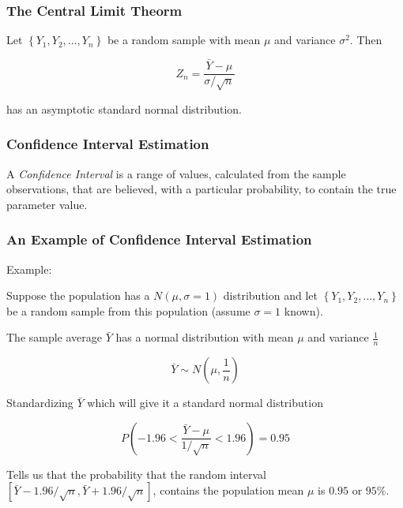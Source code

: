 \documentclass[12pt]{beamer}
\begin{document}
\begin{frame}
\frametitle{The Central Limit Theorm}
\vspace{2mm}
Let $\left\{Y_{1}, Y_{2}, \ldots, Y_{n} \right\}$ be a random sample with mean $\mu$ and variance 
$\sigma^{2}$. Then

\begin{equation*}
Z_{n} = \frac{\bar{Y} - \mu}{\sigma/\sqrt{n}}
\end{equation*}

\vspace{2mm}
has an asymptotic standard normal distribution.
\end{frame}



\begin{frame}
\frametitle{Confidence Interval Estimation}
A \emph{Confidence Interval} is a range of values, calculated from the sample observations,
that are believed, with a particular probability, to contain the true parameter value.
\end{frame}

\begin{frame}[shrink=20]
\frametitle{An Example of Confidence Interval Estimation}
Example:

\vspace{2mm}
Suppose the population has a $N(\mu, \sigma = 1)$ distribution and let 
$\left\{Y_{1}, Y_{2}, \ldots, Y_{n} \right\}$ be a random sample from this
population (assume $\sigma = 1$ known).

\vspace{2mm}
The sample average $\bar{Y}$ has a normal distribution with mean $\mu$ and variance
$\frac{1}{n}$

\begin{equation*}
\bar{Y} \sim N\left( \mu, \frac{1}{n} \right)
\end{equation*}

\vspace{2mm}
Standardizing $\bar{Y}$ which will give it a standard normal distribution

\begin{equation*}
P \left( -1.96 < \frac{\bar{Y} - \mu}{1/\sqrt{n}} < 1.96 \right) = 0.95
\end{equation*}

\vspace{2mm}
Tells us that the probability that the random interval 
$[\bar{Y} - 1.96/\sqrt{n}, \bar{Y} + 1.96/\sqrt{n} ]$, contains the population mean $\mu$
is $0.95$ or $95\%$.
\end{frame}
\end{document}

